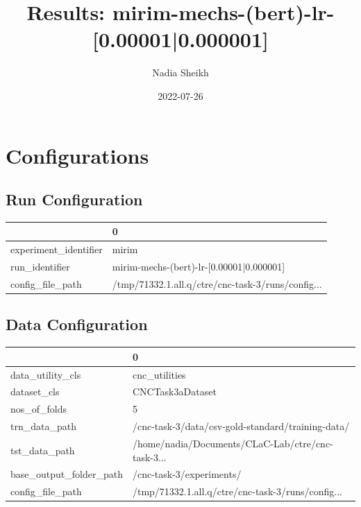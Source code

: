 \documentclass{article}
\title{Results: mirim-mechs-(bert)-lr-[0.00001|0.000001]}
\author{Nadia Sheikh}
\date{2022-07-26}
\begin{document}
\maketitle
\section{Configurations}
\subsection{Run Configuration}
\begin{tabular}{ll}
\toprule
{} &                                                  0 \\
\midrule
experiment\_identifier &                                              mirim \\
run\_identifier        &           mirim-mechs-(bert)-lr-[0.00001|0.000001] \\
config\_file\_path      &  /tmp/71332.1.all.q/ctre/cnc-task-3/runs/config... \\
\bottomrule
\end{tabular}

\subsection{Data Configuration}
\begin{tabular}{ll}
\toprule
{} &                                                  0 \\
\midrule
data\_utility\_cls        &                                      cnc\_utilities \\
dataset\_cls             &                                   CNCTask3aDataset \\
nos\_of\_folds            &                                                  5 \\
trn\_data\_path           &  /cnc-task-3/data/csv-gold-standard/training-data/ \\
tst\_data\_path           &  /home/nadia/Documents/CLaC-Lab/ctre/cnc-task-3... \\
base\_output\_folder\_path &                           /cnc-task-3/experiments/ \\
config\_file\_path        &  /tmp/71332.1.all.q/ctre/cnc-task-3/runs/config... \\
\bottomrule
\end{tabular}
\end{document}

